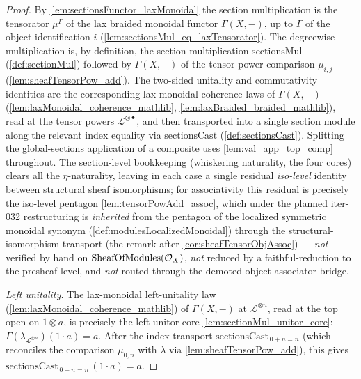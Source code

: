 \begin{proof}
  By \cref{lem:sectionsFunctor_laxMonoidal} the section multiplication is the
  tensorator \(\mu^{\Gamma}\) of the lax braided monoidal functor \(\Gamma(X,-)\),
  up to \(\Gamma\) of the object identification \(i\)
  (\cref{lem:sectionsMul_eq_laxTensorator}). The degreewise multiplication is, by
  definition, the section multiplication \(\mathrm{sectionsMul}\)
  (\cref{def:sectionMul}) followed by \(\Gamma(X,-)\) of the tensor-power comparison
  \(\mu_{i,j}\) (\cref{lem:sheafTensorPow_add}). The two-sided unitality and
  commutativity identities are the corresponding lax-monoidal coherence laws of
  \(\Gamma(X,-)\) (\cref{lem:laxMonoidal_coherence_mathlib},
  \cref{lem:laxBraided_braided_mathlib}), read at the tensor powers
  \(\mathcal{L}^{\otimes \bullet}\), and then transported into a single section
  module along the relevant index equality via \(\mathrm{sectionsCast}\)
  (\cref{def:sectionsCast}). Splitting the global-sections application of a
  composite uses \cref{lem:val_app_top_comp} throughout. The section-level
  bookkeeping (whiskering naturality, the four cores) clears all the
  \(\eta\)-naturality, leaving in each case a single residual \emph{iso-level}
  identity between structural sheaf isomorphisms; for associativity this residual is
  precisely the iso-level pentagon \cref{lem:tensorPowAdd_assoc}, which under the
  planned iter-032 restructuring is \emph{inherited} from the pentagon of the
  localized symmetric monoidal synonym (\cref{def:modulesLocalizedMonoidal}) through
  the structural-isomorphism transport (the remark after
  \cref{cor:sheafTensorObjAssoc}) --- \emph{not} verified by hand on
  \(\mathrm{SheafOfModules}(\mathcal{O}_X)\), \emph{not} reduced by a faithful-reduction to the
  presheaf level, and \emph{not} routed through the demoted object associator
  bridge.

  \emph{Left unitality.} The lax-monoidal left-unitality law
  (\cref{lem:laxMonoidal_coherence_mathlib}) of \(\Gamma(X,-)\) at
  \(\mathcal{L}^{\otimes n}\), read at the top open on \(1 \otimes a\), is precisely
  the left-unitor core \cref{lem:sectionMul_unitor_core}:
  \(\Gamma(\lambda_{\mathcal{L}^{\otimes n}})(1 \cdot a) = a\). After the index
  transport \(\mathrm{sectionsCast}_{\,0+n=n}\) (which reconciles the comparison
  \(\mu_{0,n}\) with \(\lambda\) via \cref{lem:sheafTensorPow_add}), this gives
  \(\mathrm{sectionsCast}_{\,0+n=n}\,(1 \cdot a) = a\).


\end{proof}
